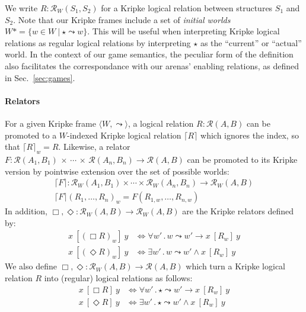 \documentclass[acmsmall,anonymous]{acmart}
\newcommand{\ifr}[1]{\ [{#1}]\ }
\begin{document}
We write $R : \mathcal{R}_W(S_1, S_2)$
for a Kripke logical relation between structures $S_1$ and $S_2$.
Note that our Kripke frames
include a set of \emph{initial worlds}
$W* = \{ w \in W \ |\  \star \leadsto w \}$.
This will be useful when interpreting Kripke logical relations
as regular logical relations
by interpreting $\star$ as the ``current'' or ``actual'' world.
In the context of our game semantics,
the peculiar form of the definition
also facilitates the correspondance with
our arenas' enabling relations,
as defined in Sec.~\ref{sec:games}.

\paragraph{Relators}

For a given Kripke frame $\langle W, \leadsto \rangle$,
a logical relation $R : \mathcal{R}(A, B)$
can be promoted to a $W$-indexed Kripke logical relation $\lceil R \rceil$
which ignores the index, so that $\lceil R \rceil_w = R$.
Likewise,
a relator
  $F : \mathcal{R}(A_1, B_1) \,\times\,\cdots\,\times\,\mathcal{R}(A_n, B_n) \rightarrow \mathcal{R}(A, B)$
can be promoted to its Kripke version
by pointwise extension over the set of possible worlds:
\begin{gather*}
  \lceil F \rceil : \mathcal{R}_W(A_1, B_1) \times \cdots \times \mathcal{R}_W(A_n, B_n) \rightarrow \mathcal{R}_W(A, B) \\
  \lceil F \rceil (R_1, \ldots, R_n)_w = F(R_{1,w}, \ldots, R_{n,w})
\end{gather*}
In addition,
$\Box, \Diamond : \mathcal{R}_W(A,B) \rightarrow \mathcal{R}_W(A,B)$
are the Kripke relators defined by:
\begin{align*}
  x \ifr{(\Box R)_w} y &\Leftrightarrow
    \forall w' \,.\, w \leadsto w' \rightarrow x \ifr{R_w} y \\
  x \ifr{(\Diamond R)_w} y &\Leftrightarrow
    \exists w' \,.\, w \leadsto w' \wedge x \ifr{R_w} y
\end{align*}
We also define
$\Box, \Diamond : \mathcal{R}_W(A,B) \rightarrow \mathcal{R}(A,B)$
which turn a Kripke logical relation $R$
into (regular) logical relations as follows:
\begin{align*}
  x \ifr{\Box R} y &\Leftrightarrow
    \forall w' \,.\, \star \leadsto w' \rightarrow x \ifr{R_w} y \\
  x \ifr{\Diamond R} y &\Leftrightarrow
    \exists w' \,.\, \star \leadsto w' \wedge x \ifr{R_w} y
\end{align*}
\end{document}
